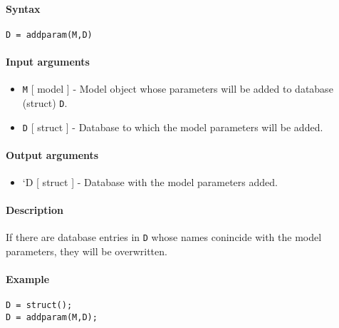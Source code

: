 


	\paragraph{Syntax}

\begin{verbatim}
D = addparam(M,D)
\end{verbatim}

\paragraph{Input arguments}

\begin{itemize}
\item
  \texttt{M} {[} model {]} - Model object whose parameters will be added
  to database (struct) \texttt{D}.
\item
  \texttt{D} {[} struct {]} - Database to which the model parameters
  will be added.
\end{itemize}

\paragraph{Output arguments}

\begin{itemize}
\itemsep1pt\parskip0pt
\item
  `D {[} struct {]} - Database with the model parameters added.
\end{itemize}

\paragraph{Description}

If there are database entries in \texttt{D} whose names conincide with
the model parameters, they will be overwritten.

\paragraph{Example}

\begin{verbatim}
D = struct();
D = addparam(M,D);
\end{verbatim}


